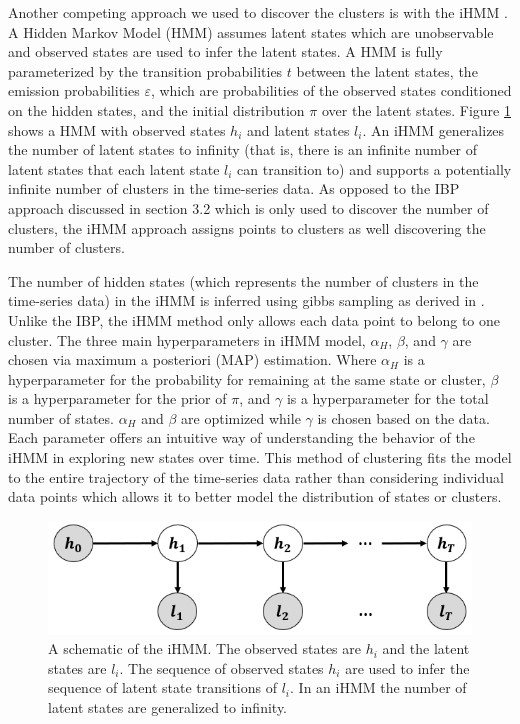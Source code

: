 \documentclass{article}
\begin{document}
Another competing approach we used to discover the clusters is with the iHMM \cite{BeamiHMM}. A Hidden Markov Model (HMM) assumes latent states which are unobservable and observed states are used to infer the latent states. A HMM is fully parameterized by the transition probabilities $t$ between the latent states, the emission probabilities $\varepsilon$, which are probabilities of the observed states conditioned on the hidden states, and the initial distribution $\pi$ over the latent states. Figure \ref{iHMM2} shows a HMM with observed states $h_{i}$ and latent states $l_{i}$. An iHMM generalizes the number of latent states to infinity (that is, there is an infinite number of latent states that each latent state $l_{i}$ can transition to) and supports a potentially infinite number of clusters in the time-series data. As opposed to the IBP approach discussed in section 3.2 which is only used to discover the number of clusters, the iHMM approach assigns points to clusters as well discovering the number of clusters. 

The number of hidden states (which represents the number of clusters in the time-series data) in the iHMM is inferred using gibbs sampling as derived in \cite{iHMMBeal}. Unlike the IBP, the iHMM method only allows each data point to belong to one cluster. The three main hyperparameters in iHMM model, $\alpha_H$, $\beta$, and $\gamma$ are chosen via maximum a posteriori (MAP) estimation. Where $\alpha_H$ is a hyperparameter for the probability for remaining at the same state or cluster, $\beta$ is a hyperparameter for the prior of $\pi$, and $\gamma$ is a hyperparameter for the total number of states. $\alpha_H$ and $\beta$ are optimized while $\gamma$ is chosen based on the data. Each parameter offers an intuitive way of understanding the behavior of the iHMM in exploring new states over time. This method of clustering fits the model to the entire trajectory of the time-series data rather than considering individual data points which allows it to better model the distribution of states or clusters.



\begin{figure}[ht]
\vskip 0.2in
\begin{center}
\centerline{\includegraphics[width=\columnwidth]{iHMM2}}
\caption{A schematic of the iHMM. The observed states are $h_{i}$ and the latent states are $l_{i}$. The sequence of observed states $h_{i}$ are used to infer the sequence of latent state transitions of $l_{i}$. In an iHMM the number of latent states are generalized to infinity.}
\label{iHMM2}
\end{center}
\vskip -0.2in
\end{figure} 
\end{document}
